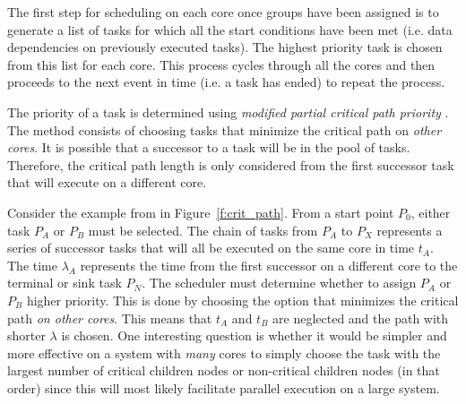 \documentclass[table,11pt]{article}
\begin{document}
The first step for scheduling on each core once groups have been assigned is to generate a list of tasks for which all the start conditions have been met (i.e. data dependencies on previously executed tasks). The highest priority task is chosen from this list for each core. This process cycles through all the cores and then proceeds to the next event in time (i.e. a task has ended) to repeat the process. 

The priority of a task is determined using \emph{modified partial critical path priority} \cite{eles2000scheduling}. The method consists of choosing tasks that minimize the critical path on \emph{other cores}. It is possible that a successor to a task will be in the pool of tasks. Therefore, the critical path length is only considered from the first successor task that will execute on a different core. 

Consider the example from \cite{eles2000scheduling} in Figure~\ref{f:crit_path}. From a start point $P_0$, either task $P_A$ or $P_B$ must be selected. The chain of tasks from $P_A$ to $P_X$ represents a series of successor tasks that will all be executed on the same core in time $t_A$. The time $\lambda_A$ represents the time from the first successor on a different core to the terminal or sink task $P_N$. The scheduler must determine whether to assign $P_A$ or $P_B$ higher priority. This is done by choosing the option that minimizes the critical path \emph{on other cores}. This means that $t_A$ and $t_B$ are neglected and the path with shorter $\lambda$ is chosen. One interesting question is whether it would be simpler and more effective on a system with \emph{many} cores to simply choose the task with the largest number of critical children nodes or non-critical children nodes (in that order) since this will most likely facilitate parallel execution on a large system.
\end{document}
